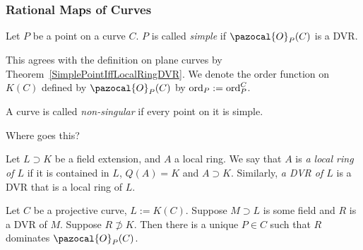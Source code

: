     \subsubsection{Rational Maps of Curves}
        \begin{definition}
            Let $P$ be a point on a curve $C$. $P$ is called \textit{simple} if $\pazocal{O}_P(C)$ is a DVR. 
        \end{definition}
        \begin{remark}
            This agrees with the definition on plane curves by Theorem~\ref{SimplePointIffLocalRingDVR}. We denote the order function on $K(C)$ defined by $\pazocal{O}_P(C)$ by $\mathrm{ord}_P:=\mathrm{ord}_P^C$. 
        \end{remark}
        \begin{definition}
            A curve is called \textit{non-singular} if every point on it is simple.
        \end{definition}
        {\Large Where goes this?}
        \begin{definition}
            Let $L\supset K$ be a field extension, and $A$ a local ring. We say that $A$ is \textit{a local ring of $L$} if it is contained in $L$, $Q(A)=K$ and $A\supset K$. Similarly, \textit{a DVR of $L$} is a DVR that is a local ring of $L$.  
        \end{definition}
        \begin{theorem}
            Let $C$ be a projective curve, $L:=K(C)$. Suppose $M\supset L$ is some field and $R$ is a DVR of $M$. Suppose $R\not\supset K$. Then there is a unique $P\in C$ such that $R$ dominates $\pazocal{O}_P(C)$. 
        \end{theorem}

